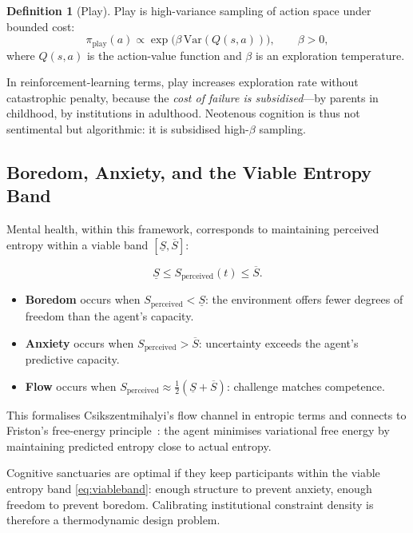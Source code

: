 \documentclass[12pt,a4paper]{article}
\theoremstyle{definition}
\newtheorem{definition}{Definition}[section]
\begin{document}
\begin{definition}[Play]
  Play is high-variance sampling of action space under bounded cost:
  \begin{equation}
    \pi_{\mathrm{play}}(a) \propto \exp\!\bigl(\beta\,\mathrm{Var}(Q(s,a))\bigr),
    \qquad \beta > 0,
  \end{equation}
  where $Q(s,a)$ is the action-value function and $\beta$ is an exploration
  temperature.
\end{definition}

In reinforcement-learning terms, play increases exploration rate without
catastrophic penalty, because the \emph{cost of failure is subsidised}---by
parents in childhood, by institutions in adulthood.  Neotenous cognition is
thus not sentimental but algorithmic: it is subsidised high-$\beta$ sampling.

\subsection{Boredom, Anxiety, and the Viable Entropy Band}

Mental health, within this framework, corresponds to maintaining perceived
entropy within a viable band $[\underline{S}, \overline{S}]$:

\begin{equation}
  \underline{S} \leq S_{\mathrm{perceived}}(t) \leq \overline{S}.
  \label{eq:viableband}
\end{equation}

\begin{itemize}[leftmargin=*]
  \item \textbf{Boredom} occurs when $S_{\mathrm{perceived}} < \underline{S}$:
    the environment offers fewer degrees of freedom than the agent's capacity.
  \item \textbf{Anxiety} occurs when $S_{\mathrm{perceived}} > \overline{S}$:
    uncertainty exceeds the agent's predictive capacity.
  \item \textbf{Flow} occurs when $S_{\mathrm{perceived}} \approx \frac{1}{2}
    (\underline{S} + \overline{S})$: challenge matches competence.
\end{itemize}

This formalises Csikszentmihalyi's flow channel in entropic terms and connects
to Friston's free-energy principle~\citep{friston2023}: the agent minimises
variational free energy by maintaining predicted entropy close to actual
entropy.

\begin{tcolorbox}[policybox]
  Cognitive sanctuaries are optimal if they keep participants within the viable
  entropy band \eqref{eq:viableband}: enough structure to prevent anxiety,
  enough freedom to prevent boredom.  Calibrating institutional constraint
  density is therefore a thermodynamic design problem.
\end{tcolorbox}
\end{document}
